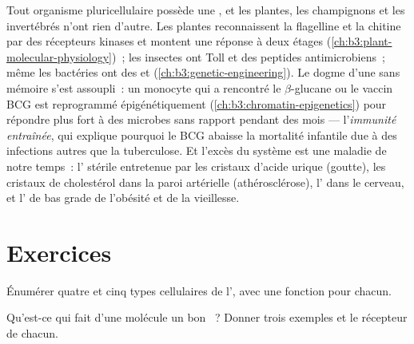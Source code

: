 \begin{remark}\label{rem:b3:innate-immunity:everywhere}
Tout organisme pluricellulaire possède une , et les
plantes, les champignons et les invertébrés n'ont rien d'autre. Les
plantes reconnaissent la flagelline et la chitine par des récepteurs
kinases et montent une réponse à deux étages
(\cref{ch:b3:plant-molecular-physiology})~; les insectes ont Toll et des
peptides antimicrobiens~; même les bactéries ont des  et  (\cref{ch:b3:genetic-engineering}). Le dogme d'une
 sans mémoire s'est assoupli~: un monocyte qui a rencontré
le $\beta$-glucane ou le vaccin BCG est reprogrammé épigénétiquement
(\cref{ch:b3:chromatin-epigenetics}) pour répondre plus fort à des
microbes sans rapport pendant des mois --- l'\emph{immunité entraînée},
qui explique pourquoi le BCG abaisse la mortalité infantile due à des
infections autres que la tuberculose. Et l'excès du système est une
maladie de notre temps~: l' stérile entretenue par les
cristaux d'acide urique (goutte), les cristaux de cholestérol dans la
paroi artérielle (athérosclérose), l' dans le cerveau, et
l' de bas grade de l'obésité et de la vieillesse.
\end{remark}

\section{Exercices}

\begin{exercise}[$\star$]\label{exo:b3:innate-immunity:1}
Énumérer quatre  et cinq types cellulaires de l',
avec une fonction pour chacun.
\end{exercise}

\begin{exercise}[$\star$]\label{exo:b3:innate-immunity:2}
Qu'est-ce qui fait d'une molécule un bon ~? Donner trois exemples et le récepteur de chacun.
\end{exercise}

